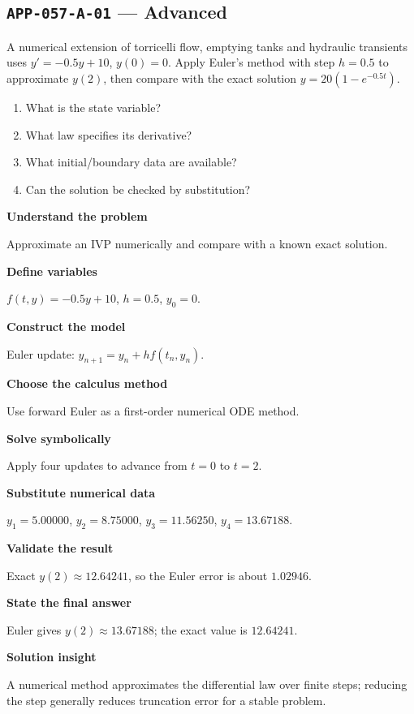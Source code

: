 \documentclass[11pt]{book}
\newcommand{\pid}[1]{\texttt{#1}}
\begin{document}
\subsection*{\pid{APP-057-A-01} — Advanced}
\begin{problembox}
A numerical extension of torricelli flow, emptying tanks and hydraulic transients uses $y'=-0.5y+10$, $y(0)=0$. Apply Euler's method with step $h=0.5$ to approximate $y(2)$, then compare with the exact solution $y=20(1-e^{-0.5t})$.
\end{problembox}
\begin{promptbox}\begin{enumerate}
\item What is the state variable?
\item What law specifies its derivative?
\item What initial/boundary data are available?
\item Can the solution be checked by substitution?
\end{enumerate}\end{promptbox}
\begin{solutionbox}
\textbf{Understand the problem}\par Approximate an IVP numerically and compare with a known exact solution.\par\medskip
\textbf{Define variables}\par $f(t,y)=-0.5y+10$, $h=0.5$, $y_0=0$.\par\medskip
\textbf{Construct the model}\par Euler update: $y_{n+1}=y_n+h f(t_n,y_n)$.\par\medskip
\textbf{Choose the calculus method}\par Use forward Euler as a first-order numerical ODE method.\par\medskip
\textbf{Solve symbolically}\par Apply four updates to advance from $t=0$ to $t=2$.\par\medskip
\textbf{Substitute numerical data}\par $y_1=5.00000$, $y_2=8.75000$, $y_3=11.56250$, $y_4=13.67188$.\par\medskip
\textbf{Validate the result}\par Exact $y(2)\approx 12.64241$, so the Euler error is about $1.02946$.\par\medskip
\textbf{State the final answer}\par Euler gives $y(2)\approx 13.67188$; the exact value is $12.64241$.\par\medskip
\textbf{Solution insight}\par A numerical method approximates the differential law over finite steps; reducing the step generally reduces truncation error for a stable problem.\par\medskip
\end{solutionbox}
\end{document}
